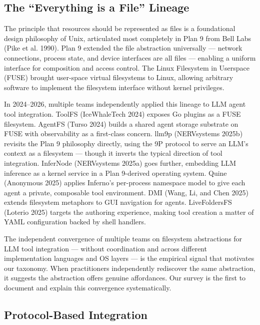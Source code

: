 \documentclass[
  11pt,
]{article}
\begin{document}
\hypertarget{the-everything-is-a-file-lineage}{%
\subsection{The ``Everything is a File''
Lineage}\label{the-everything-is-a-file-lineage}}

The principle that resources should be represented as files is a
foundational design philosophy of Unix, articulated most completely in
Plan 9 from Bell Labs (Pike et al. 1990). Plan 9 extended the file
abstraction universally --- network connections, process state, and
device interfaces are all files --- enabling a uniform interface for
composition and access control. The Linux Filesystem in Userspace (FUSE)
brought user-space virtual filesystems to Linux, allowing arbitrary
software to implement the filesystem interface without kernel
privileges.

In 2024--2026, multiple teams independently applied this lineage to LLM
agent tool integration. ToolFS (IceWhaleTech 2024) exposes Go plugins as
a FUSE filesystem. AgentFS (Turso 2024) builds a shared agent storage
substrate on FUSE with observability as a first-class concern. llm9p
(NERVsystems 2025b) revisits the Plan 9 philosophy directly, using the
9P protocol to serve an LLM's context as a filesystem --- though it
inverts the typical direction of tool integration. InferNode
(NERVsystems 2025a) goes further, embedding LLM inference as a kernel
service in a Plan 9-derived operating system. Quine (Anonymous 2025)
applies Inferno's per-process namespace model to give each agent a
private, composable tool environment. DMI (Wang, Li, and Chen 2025)
extends filesystem metaphors to GUI navigation for agents. LiveFoldersFS
(Loterio 2025) targets the authoring experience, making tool creation a
matter of YAML configuration backed by shell handlers.

The independent convergence of multiple teams on filesystem abstractions
for LLM tool integration --- without coordination and across different
implementation languages and OS layers --- is the empirical signal that
motivates our taxonomy. When practitioners independently rediscover the
same abstraction, it suggests the abstraction offers genuine
affordances. Our survey is the first to document and explain this
convergence systematically.

\hypertarget{protocol-based-integration}{%
\subsection{Protocol-Based
Integration}\label{protocol-based-integration}}
\end{document}
